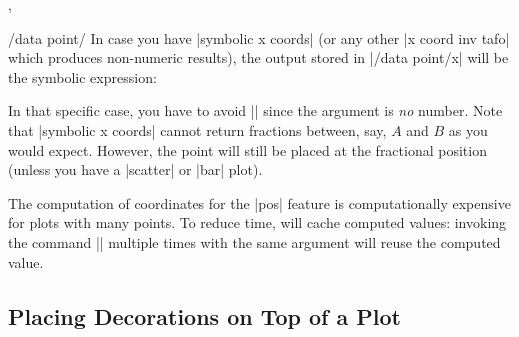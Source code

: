 {\begin{commandlist}{\pgfplotspointplotattime,\pgfplotspointplotattime{}}
\begin{pgfplotsxykeylist}{/data point/\x}
        In case you have |symbolic x coords| (or any other |x coord inv tafo|
        which produces non-numeric results), the output stored in
        |/data point/x| will be the symbolic expression:
\begin{codeexample}[]
\end{codeexample}
        \noindent In that specific case, you have to avoid
        |\pgfmathprintnumber| since the argument is \emph{no} number. Note that
        |symbolic x coords| cannot return fractions between, say, $A$ and $B$
        as you would expect. However, the point will still be placed at the
        fractional position (unless you have a |scatter| or |bar| plot).

         The computation of coordinates for the |pos| feature is
         computationally expensive for plots with many points. To reduce time,
         \PGFPlots{} will cache computed values: invoking the command
         |\pgfplotspointplotattime| multiple times with the same argument will
         reuse the computed value.
    \end{pgfplotsxykeylist}
\end{commandlist}

}


\subsection{Placing Decorations on Top of a Plot}

